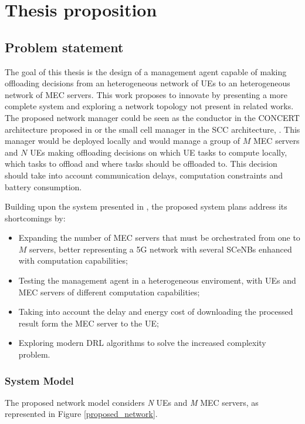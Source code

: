 \chapter{Thesis proposition}

\section{Problem statement}
\noindent The goal of this thesis is the design of a management agent capable of making offloading decisions from an heterogeneous network of \acrshort{UE}s to an heterogeneous network of \acrshort{MEC} servers. This work proposes to innovate by presenting a more complete system and exploring a network topology not present in related works. The proposed network manager could be seen as the conductor in the CONCERT architecture proposed in \cite{CONCERT} or the small cell manager in the \acrshort{SCC} architecture, \cite{SESAM}. This manager would be deployed locally and would manage a group of $M$ \acrshort{MEC} servers and $N$ \acrshort{UE}s making offloading decisions on which \acrshort{UE} tasks to compute locally, which tasks to offload and where tasks should be offloaded to. This decision should take into account communication delays, computation constraints and battery consumption.

Building upon the system presented in \cite{NUE1mec}, the proposed system plans address its shortcomings by:
\begin{itemize}
    \item Expanding the number of \acrshort{MEC} servers that must be orchestrated from one to $M$ servers, better representing a 5G network with several \acrshort{SCeNBs} enhanced with computation capabilities;
    \item Testing the management agent in a heterogeneous enviroment, with \acrshort{UE}s and \acrshort{MEC} servers of different computation capabilities;
    \item Taking into account the delay and energy cost of downloading the processed result form the \acrshort{MEC} server to the \acrshort{UE};
    \item Exploring modern \acrshort{DRL} algorithms to solve the increased complexity problem.
\end{itemize}

\subsection{System Model}
\noindent The proposed network model considers \emph{N} \acrshort{UE}s and \emph{M} \acrshort{MEC} servers, as represented in Figure \ref{proposed_network}. 

